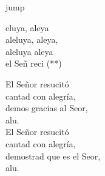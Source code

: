 \begin{cancion}jump\\
	\begin{chorus}%
		eluya, aleya\\
		aleluya, aleya,\\
		aleluya aleya\\
		el Señ reci (**)\jump\\
	\end{chorus}%
	\jump
El Señor resucitó\\
	\jump
cantad con alegría,\\
	demos gracias al Seor,\\
	alu. \\
	\jump
El Señor resucitó\\
	\jump
cantad con alegría,\\
	demostrad que es el Seor,\\
	alu. \\
\end{cancion}%
